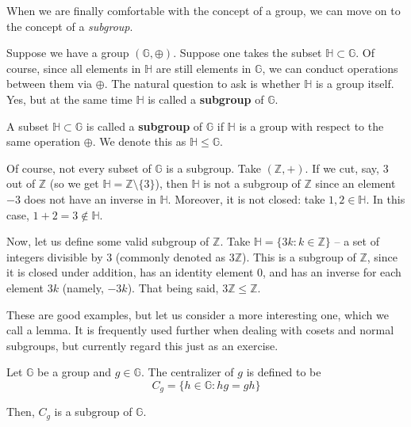 \documentclass[../lecture-notes.tex]{subfiles}
\begin{document}
When we are finally comfortable with the concept of a group, we can move on to the concept of a \textit{subgroup}. 

Suppose we have a group $(\mathbb{G},\oplus)$. Suppose one takes the subset $\mathbb{H} \subset \mathbb{G}$. Of course, since all elements in $\mathbb{H}$ are still elements in $\mathbb{G}$, we can conduct operations between them via $\oplus$. 
The natural question to ask is whether $\mathbb{H}$ is a group itself. Yes, but at the same time $\mathbb{H}$ is called a \textbf{subgroup} of $\mathbb{G}$.

\begin{definition}
    A subset $\mathbb{H} \subset \mathbb{G}$ is called a \textbf{subgroup} of $\mathbb{G}$ if $\mathbb{H}$ is a group with respect to the same operation $\oplus$. We denote this as $\mathbb{H} \leq \mathbb{G}$.
\end{definition}

\begin{example}
    Of course, not every subset of $\mathbb{G}$ is a subgroup. Take $(\mathbb{Z}, +)$. If we cut, say, $3$ out of $\mathbb{Z}$ (so we get $\mathbb{H} = \mathbb{Z} \setminus \{3\}$), then $\mathbb{H}$ is not a subgroup of $\mathbb{Z}$ since an element $-3$ does not have an inverse in $\mathbb{H}$. Moreover, it is not closed: take $1,2 \in \mathbb{H}$. In this case, $1+2 = 3 \notin \mathbb{H}$.
\end{example}

\begin{example}
    Now, let us define some valid subgroup of $\mathbb{Z}$. Take $\mathbb{H} = \{3k: k \in \mathbb{Z}\}$ -- a set of integers divisible by $3$ (commonly denoted as $3\mathbb{Z}$). This is a subgroup of $\mathbb{Z}$, since it is closed under addition, has an identity element $0$, and has an inverse for each element $3k$ (namely, $-3k$). That being said, $3\mathbb{Z} \leq \mathbb{Z}$.
\end{example}

These are good examples, but let us consider a more interesting one, which we call a lemma. It is frequently used further when dealing with cosets and normal subgroups, but currently regard this just as an exercise.
\begin{lemma}
    Let $\mathbb{G}$ be a group and $g \in \mathbb{G}$. The centralizer of $g$ is defined to be
    \begin{equation*}
        C_g = \{h \in \mathbb{G}: h g = g h\}
    \end{equation*}

    Then, $C_g$ is a subgroup of $\mathbb{G}$.
\end{lemma}
\end{document}

